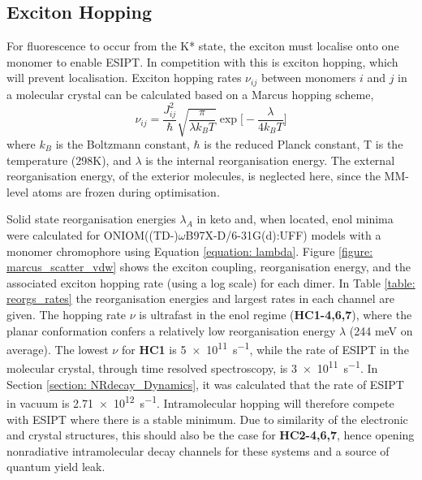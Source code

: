 \subsection{Exciton Hopping}\label{section: Connecting_Marcus}
For fluorescence to occur from the K* state, the exciton must localise onto one monomer to enable ESIPT. In competition with this is exciton hopping, which will prevent localisation. Exciton hopping rates $\nu_{ij}$ between monomers $i$ and $j$ in a molecular crystal can be calculated based on a Marcus hopping scheme,\cite{Stehr2014,Bruckner2016,Kimura2000,Bredas2004} 
\begin{equation}
\nu_{ij}=\frac{J_{ij}^2}{\hbar}\sqrt{\frac{\pi}{\lambda k_{B}T}}\exp\bigg[-\frac{\lambda}{4k_{B}T}\bigg]
\label{equation: marcus}
\end{equation}
where $k_{B}$ is the Boltzmann constant, $\hbar$ is the reduced Planck
constant, T is the temperature (298K), and $\lambda$ is the internal reorganisation energy. The external reorganisation energy, of the exterior molecules, is neglected here, since the MM-level atoms are frozen during optimisation.

Solid state reorganisation energies $\lambda_{A}$ in keto and, when located, enol minima were calculated for ONIOM((TD-)$\omega$B97X-D/6-31G(d):UFF) models with a monomer chromophore using Equation \ref{equation: lambda}. Figure \ref{figure: marcus_scatter_vdw} shows the exciton coupling, reorganisation energy, and the associated exciton hopping rate (using a log scale) for each dimer. In Table \ref{table: reorgs_rates} the reorganisation energies and largest rates in each channel are given. The hopping rate $\nu$ is ultrafast in the enol regime (\textbf{HC1-4,6,7}), where the planar conformation confers a relatively low reorganisation energy $\lambda$ (244 meV on average). The lowest $\nu$ for \textbf{HC1} is \SI{5e11}{s^{-1}}, while the rate of ESIPT in the molecular crystal, through time resolved spectroscopy, is \SI{3e11}{s^{-1}}.\cite{Zahid2017} In Section \ref{section: NRdecay_Dynamics}, it was calculated that the rate of ESIPT in vacuum is \SI{2.71e12}{s^{-1}}. Intramolecular hopping will therefore compete with ESIPT where there is a stable \Estar{} minimum. Due to similarity of the electronic and crystal structures, this should also be the case for \textbf{HC2-4,6,7}, hence opening nonradiative intramolecular decay channels for these systems and a source of quantum yield leak.

